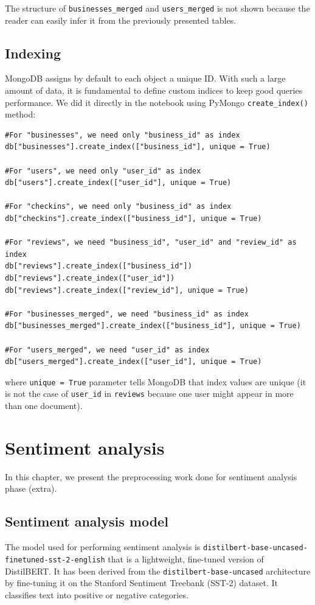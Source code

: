 \documentclass{Configuration_Files/PoliMi3i_thesis}
\begin{document}
The structure of \texttt{businesses\_merged} and \texttt{users\_merged} is not shown because the reader can easily infer it from the previously presented tables.

\section{Indexing}
MongoDB assigns by default to each object a  unique ID. With such a large amount of data, it is fundamental to define custom indices to keep good queries performance. We did it directly in the notebook using PyMongo \texttt{create\_index()} method:

\bigskip

\begin{verbatim}
#For "businesses", we need only "business_id" as index
db["businesses"].create_index(["business_id"], unique = True)

#For "users", we need only "user_id" as index
db["users"].create_index(["user_id"], unique = True)

#For "checkins", we need only "business_id" as index
db["checkins"].create_index(["business_id"], unique = True)

#For "reviews", we need "business_id", "user_id" and "review_id" as index
db["reviews"].create_index(["business_id"])
db["reviews"].create_index(["user_id"])
db["reviews"].create_index(["review_id"], unique = True)

#For "businesses_merged", we need "business_id" as index
db["businesses_merged"].create_index(["business_id"], unique = True)

#For "users_merged", we need "user_id" as index
db["users_merged"].create_index(["user_id"], unique = True)
\end{verbatim}

\bigskip

where \texttt{unique = True} parameter tells MongoDB that index values are unique (it is not the case of \texttt{user\_id} in \texttt{reviews} because one user might appear in more than one document). 

\cleardoublepage

\chapter{Sentiment analysis}
In this chapter, we present the preprocessing work done for sentiment analysis phase (extra). 

\section{Sentiment analysis model}
\label{sent_model}
The model used for performing sentiment analysis is \texttt{distilbert-base-uncased-\\finetuned-sst-2-english} that is a lightweight, fine-tuned version of DistilBERT. It has been derived from the \texttt{distilbert-base-uncased} architecture by fine-tuning it on the Stanford Sentiment Treebank (SST-2) dataset. It classifies text into positive or negative categories. 
\end{document}
